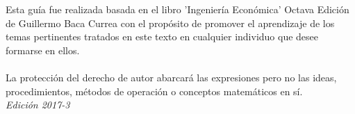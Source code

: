 \documentclass[11pt,fleqn]{book} %
\numberwithin{equation}{section} %
\numberwithin{figure}{section} %
\numberwithin{table}{section} %
\begin{document}
\vspace{4mm}
\\ \hline \\
\vspace{2mm}

\noindent Esta guía fue realizada basada en el libro 'Ingeniería Económica' Octava Edición de Guillermo Baca Currea con el propósito de promover el aprendizaje de los temas pertinentes tratados en este texto en cualquier individuo que desee formarse en ellos.\\ \hline \\
\vspace{2mm} La protección del derecho de autor abarcará las expresiones pero no las ideas, procedimientos, métodos de operación o conceptos matemáticos en sí.\\%

\noindent \textit{Edición 2017-3}


\clearpage



\pagestyle{empty} %

 \tableofcontents %

\cleardoublepage %

\pagestyle{fancy} %


\graphicspath{ {img/} }%














\end{document}
